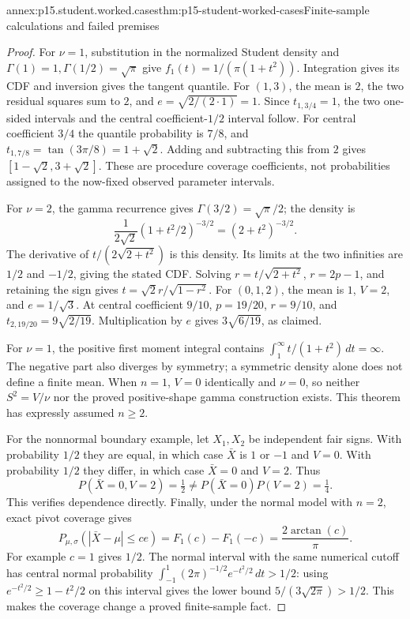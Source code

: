 \begin{annexitem}{annex:p15.student.worked.cases}{thm:p15-student-worked-cases}{Finite-sample calculations and failed premises}
\begin{proof}
For \(\nu=1\), substitution in the
normalized Student density and
\(\Gamma(1)=1,\Gamma(1/2)=\sqrt\pi\)
give \(f_1(t)=1/(\pi(1+t^2))\).
Integration gives its CDF and inversion
gives the tangent quantile.
For \((1,3)\), the mean is \(2\),
the two residual squares sum to \(2\),
and \(e=\sqrt{2/(2\cdot1)}=1\).
Since \(t_{1,3/4}=1\), the two
one-sided intervals and the central
coefficient-\(1/2\) interval follow.
For central coefficient \(3/4\)
the quantile probability is \(7/8\),
and
\(t_{1,7/8}=\tan(3\pi/8)=1+\sqrt2\).
Adding and subtracting this from \(2\)
gives \([1-\sqrt2,3+\sqrt2]\).
These are procedure coverage
coefficients, not probabilities
assigned to the now-fixed observed
parameter intervals.

For \(\nu=2\), the gamma recurrence
gives \(\Gamma(3/2)=\sqrt\pi/2\);
the density is
\[
 \frac{1}{2\sqrt2}(1+t^2/2)^{-3/2}
                       =(2+t^2)^{-3/2}.
\]
The derivative of \(t/(2\sqrt{2+t^2})\)
is this density. Its limits at the two
infinities are \(1/2\) and \(-1/2\),
giving the stated CDF. Solving
\(r=t/\sqrt{2+t^2}\), \(r=2p-1\),
and retaining the sign gives
\(t=\sqrt2r/\sqrt{1-r^2}\).
For \((0,1,2)\), the mean is \(1\),
\(V=2\), and \(e=1/\sqrt3\).
At central coefficient \(9/10\),
\(p=19/20\), \(r=9/10\), and
\(t_{2,19/20}=9\sqrt{2/19}\).
Multiplication by \(e\) gives
\(3\sqrt{6/19}\), as claimed.

For \(\nu=1\), the positive first
moment integral contains
\(\int_1^\infty t/(1+t^2)\,dt=\infty\).
The negative part also diverges by
symmetry; a symmetric density alone
does not define a finite mean.
When \(n=1\), \(V=0\) identically and
\(\nu=0\), so neither \(S^2=V/\nu\)
nor the proved positive-shape gamma
construction exists. This theorem
has expressly assumed \(n\geq2\).

For the nonnormal boundary example,
let \(X_1,X_2\) be independent fair
signs. With probability \(1/2\) they
are equal, in which case \(\bar X\)
is \(1\) or \(-1\) and \(V=0\).
With probability \(1/2\) they differ,
in which case \(\bar X=0\) and \(V=2\).
Thus
\[
 P(\bar X=0,V=2)=\tfrac12
       \ne P(\bar X=0)P(V=2)=\tfrac14.
\]
This verifies dependence directly.
Finally, under the normal model with
\(n=2\), exact pivot coverage gives
\[
 P_{\mu,\sigma}(|\bar X-\mu|\leq ce)
                 =F_1(c)-F_1(-c)
                 =\frac{2\arctan(c)}{\pi}.
\]
For example \(c=1\) gives \(1/2\).
The normal interval with the same
numerical cutoff has central normal
probability \(\int_{-1}^1
(2\pi)^{-1/2}e^{-t^2/2}\,dt>1/2\):
using \(e^{-t^2/2}\geq1-t^2/2\)
on this interval gives the lower bound
\(5/(3\sqrt{2\pi})>1/2\).
This makes the coverage change a
proved finite-sample fact.
\end{proof}
\end{annexitem}
